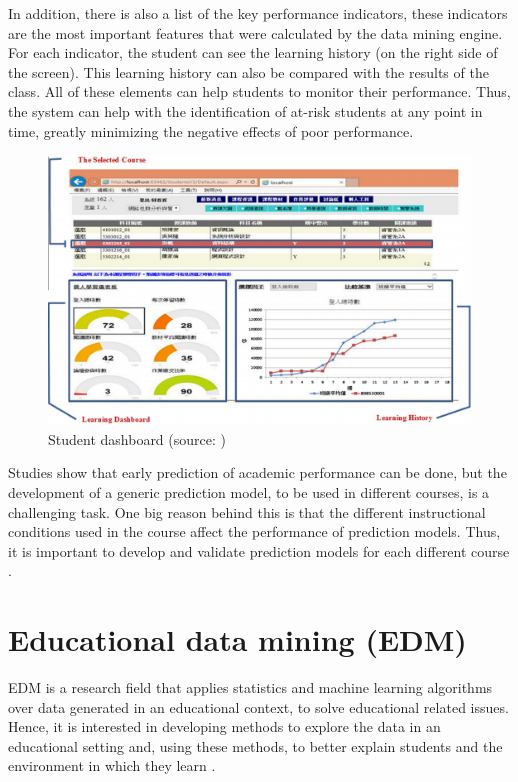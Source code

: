 In addition, there is also a list of the key performance indicators, these indicators are the most important features that were calculated by the data mining engine. For each indicator, the student can see the learning history (on the right side of the screen). This learning history can also be compared with the results of the class. All of these elements can help students to monitor their performance. Thus, the system can help with the identification of at-risk students at any point in time, greatly minimizing the negative effects of poor performance.

\begin{figure}[htb]
	\centering
  	\includegraphics[scale=.5]{Imagens/lms.png}
  	\caption{Student dashboard (source: \cite{shi2014developing})}
  	\label{fig:lms}
\end{figure}

Studies show that early prediction of academic performance can be done, but the development of a generic prediction model, to be used in different courses, is a challenging task. One big reason behind this is that the different instructional conditions used in the course affect the performance of prediction models. Thus, it is important to develop and validate prediction models for each different course \cite{akccapinar2019using}.

\section{Educational data mining (EDM)}
\label{sc:edm}

EDM is a research field that applies statistics and machine learning algorithms over data generated in an educational context, to solve educational related issues. Hence, it is interested in developing methods to explore the data in an educational setting and, using these methods, to better explain students and the environment in which they learn \cite{romero2010educational}.

